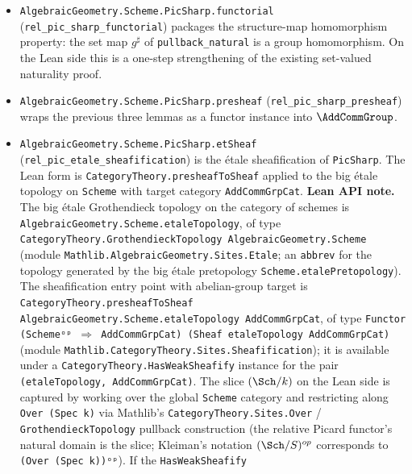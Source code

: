 \begin{itemize}
    \cref{thm:relative_pic_quotient_well_defined} +
    \cref{lem:rel_pic_sharp_groupoid}.
  \item \texttt{AlgebraicGeometry.Scheme.PicSharp.functorial}
    (\texttt{rel\_pic\_sharp\_functorial}) packages the structure-map
    homomorphism property: the set map \(g^\sharp\) of
    \texttt{pullback\_natural} is a group homomorphism. On the Lean side
    this is a one-step strengthening of the existing set-valued naturality
    proof.
  \item \texttt{AlgebraicGeometry.Scheme.PicSharp.presheaf}
    (\texttt{rel\_pic\_sharp\_presheaf}) wraps the previous three lemmas as a
    functor instance into \(\AddCommGroup\).
  \item \texttt{AlgebraicGeometry.Scheme.PicSharp.etSheaf}
    (\texttt{rel\_pic\_etale\_sheafification}) is the \'etale sheafification
    of \texttt{PicSharp}. The Lean form is
    \texttt{CategoryTheory.presheafToSheaf} applied to the big \'etale
    topology on \texttt{Scheme} with target category
    \texttt{AddCommGrpCat}.
    \textbf{Lean API note.} The big \'etale Grothendieck topology on the
    category of schemes is
    \texttt{AlgebraicGeometry.Scheme.etaleTopology}, of type
    \texttt{CategoryTheory.GrothendieckTopology AlgebraicGeometry.Scheme}
    (module \texttt{Mathlib.AlgebraicGeometry.Sites.Etale}; an
    \texttt{abbrev} for the topology generated by the big \'etale
    pretopology \texttt{Scheme.etalePretopology}). The sheafification
    entry point with abelian-group target is
    \texttt{CategoryTheory.presheafToSheaf
    AlgebraicGeometry.Scheme.etaleTopology AddCommGrpCat}, of type
    \texttt{Functor (Schemeᵒᵖ \(\Rightarrow\) AddCommGrpCat)
    (Sheaf etaleTopology AddCommGrpCat)} (module
    \texttt{Mathlib.CategoryTheory.Sites.Sheafification}); it is
    available under a \texttt{CategoryTheory.HasWeakSheafify} instance
    for the pair \texttt{(etaleTopology, AddCommGrpCat)}. The slice
    \((\Sch/k)\) on the Lean side is captured by working over the
    global \texttt{Scheme} category and restricting along
    \texttt{Over (Spec k)} via Mathlib's
    \texttt{CategoryTheory.Sites.Over} / \texttt{GrothendieckTopology}
    pullback construction (the relative Picard functor's natural domain
    is the slice; Kleiman's notation \((\Sch/S)^{op}\) corresponds to
    \texttt{(Over (Spec k))ᵒᵖ}). If the \texttt{HasWeakSheafify}

\end{itemize}
